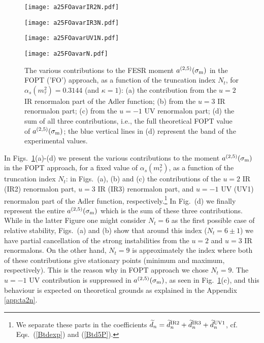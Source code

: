 \documentclass[aps,nofootinbib,showkeys,noshowpacs,preprintnumbers,amsmath,amssymb]{revtex4}
\newcommand{\sm}{{\sigma_{\rm m}}}
\newcommand{\td}{{\widetilde d}}
\begin{document}
  
\begin{figure}[htb] %
\begin{minipage}[b]{.49\linewidth}
\texttt{[image: a25FOavarIR2N.pdf]}
\end{minipage}
\begin{minipage}[b]{.49\linewidth}
\texttt{[image: a25FOavarIR3N.pdf]}
\end{minipage}
\begin{minipage}[b]{.49\linewidth}
\texttt{[image: a25FOavarUV1N.pdf]}
\end{minipage}
\begin{minipage}[b]{.49\linewidth}
\texttt{[image: a25FOavarN.pdf]}
\end{minipage}
\caption{The various contributions to the FESR moment $a^{(2,5)}(\sm)$ in the FOPT ('FO') approach, as a function of the truncation index $N_t$, for $\alpha_s(m_{\tau}^2)=0.3144$ (and $\kappa=1$): (a) the contribution from the $u=2$ IR renormalon part of the Adler function; (b) from the $u=3$ IR renormalon part; (c) from the $u=-1$ UV renormalon part; (d) the sum of all three contributions, i.e., the full theoretical FOPT value of  $a^{(2,5)}(\sm)$; the blue vertical lines in (d) represent the band of the experimental values.}
\label{a25FOavar}
\end{figure}
In Figs.~\ref{a25FOavar}(a)-(d) we present the various contributions to the moment $a^{(2,5)}(\sm)$ in the FOPT approach, for a fixed value of $\alpha_s(m_{\tau}^2)$, as a function of the truncation index $N_t$: in Figs.~(a), (b) and (c) the contributions of the $u=2$ IR (IR2) renormalon part, $u=3$ IR (IR3) renormalon part, and $u=-1$ UV (UV1) renormalon part of the Adler function, respectively.\footnote{We separate these parts in the coefficients $\td_n = \td_n^{\rm IR2} + \td_n^{\rm IR3} +\td_n^{\rm UV1}$, cf. Eqs.~(\ref{Btdexp}) and (\ref{Btd5P}).} In Fig.~(d)  we finally represent the entire  $a^{(2,5)}(\sm)$ which is the sum of these three contributions. While in the latter Figure one might consider $N_t=6$ as the first possible case of relative stability, Figs.~(a) and (b) show that around this index ($N_t=6 \pm 1$) we have partial cancellation of the strong instabilities from the $u=2$ and $u=3$ IR renormalons. On the other hand, $N_t= 9$ is approximately the index where both of these contributions give stationary points (minimum and maximum, respectively). This is the reason why in FOPT approach we chose $N_t=9$. The $u=-1$ UV contribution is suppressed in $a^{(2,5)}(\sm)$, as seen in Fig.~\ref{a25FOavar}(c), and this behaviour is expected on theoretical grounds as explained in the Appendix \ref{app:ta2n}.  
\end{document}
